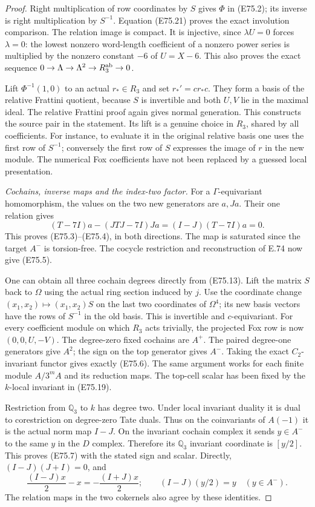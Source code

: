\begin{proof}
Right multiplication of row coordinates by
$S$ gives $\Phi$ in (E75.2); its inverse is
right multiplication by $S^{-1}$.
Equation (E75.21) proves the exact involution
comparison. The relation image is compact.
It is injective, since $\lambda U=0$ forces
$\lambda=0$: the lowest nonzero word-length
coefficient of a nonzero power series is
multiplied by the nonzero constant $-6$ of
$U=X-6$. This also proves the exact sequence
$0\to\Lambda\to\Lambda^2\to R_3^{\rm ab}\to0$.

Lift $\Phi^{-1}(1,0)$ to an actual $r_*\in R_3$
and set $r_*'=cr_*c$. They form a basis of the
relative Frattini quotient, because $S$ is
invertible and both $U,V$ lie in the maximal
ideal. The relative Frattini proof again gives
normal generation. This constructs the source
pair in the statement. Its lift is a genuine
choice in $R_3$, shared by all coefficients.
For instance, to evaluate it in the original
relative basis one uses the first row of
$S^{-1}$; conversely the first row of $S$
expresses the image of $r$ in the new module.
The numerical Fox coefficients have not been
replaced by a guessed local presentation.

\emph{Cochains, inverse maps and the index-two factor.}
For a $\Gamma$-equivariant homomorphism, the
values on the two new generators are $a,Ja$.
Their one relation gives
\[
 (T-7I)a-(JTJ-7I)Ja
      =(I-J)(T-7I)a=0.
 \tag{E75.22}
\]
This proves (E75.3)--(E75.4), in both directions.
The map is saturated since the target $A^-$
is torsion-free. The cocycle restriction and
reconstruction of E.74 now give (E75.5).

One can obtain all three cochain degrees
directly from (E75.13). Lift the matrix $S$
back to $\Omega$ using the actual ring section
induced by $j$. Use the coordinate change
$(x_1,x_2)\mapsto(x_1,x_2)S$ on the last
two coordinates of $\Omega^4$; its new basis
vectors have the rows of $S^{-1}$ in the old
basis. This is invertible and $c$-equivariant.
For every coefficient module
on which $R_3$ acts trivially, the projected
Fox row is now $(0,0,U,-V)$.
The degree-zero fixed cochains are $A^+$.
The paired degree-one generators give $A^2$;
the sign on the top generator gives $A^-$.
Taking the exact $C_2$-invariant functor gives
exactly (E75.6). The same argument works for
each finite module $A/3^mA$ and its reduction
maps. The top-cell scalar has been fixed by
the $k$-local invariant in (E75.19).

Restriction from $\mathbb Q_3$ to $k$ has
degree two. Under local invariant duality it
is dual to corestriction on degree-zero Tate
duals. Thus on the coinvariants of $A(-1)$
it is the actual norm map $I-J$.
On the invariant cochain complex it sends
$y\in A^-$ to the same $y$ in the $D$
complex. Therefore its $\mathbb Q_3$ invariant
coordinate is $[y/2]$. This proves (E75.7)
with the stated sign and scalar. Directly,
$(I-J)(J+I)=0$, and
\[
 \frac{(I-J)x}{2}-x=-\frac{(I+J)x}{2};
 \qquad (I-J)(y/2)=y\quad(y\in A^-).
 \tag{E75.23}
\]
The relation maps in the two cokernels also
agree by these identities.


\end{proof}
